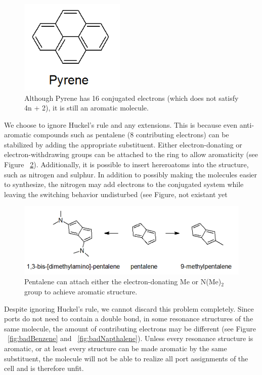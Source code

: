 \documentclass[12pt]{article}
\begin{document}
\begin{figure}[ht!]
\centering
\includegraphics[width=50mm]{pyrene.png}
\caption{Although Pyrene has 16 conjugated electrons (which does not satisfy 4n + 2), it is still an aromatic molecule.}
\label{fig:pyrene}
\end{figure}



We choose to ignore Huckel's rule and any extensions. This is because even anti-aromatic compounds such as pentalene (8 contributing electrons) can be stabilized by adding the appropriate substituent. Either electron-donating or electron-withdrawing groups can be attached to the ring to allow aromaticity (see Figure ~\ref{fig:pentalene}). Additionally, it is possible to insert hereroatoms into the structure, such as nitrogen and sulphur. In addition to possibly making the molecules easier to synthesize, the nitrogen may add electrons to the conjugated system while leaving the switching behavior undisturbed \cite{v06} (see Figure, not existant yet%

\begin{figure}[ht!]
\centering
\includegraphics[width=160mm]{pentalene.png}
\caption{Pentalene can attach either the electron-donating Me \cite{methylPentalene} or N(Me)$_2$ \cite{nitrogenPentalene} group to achieve aromatic structure.}
\label{fig:pentalene}
\end{figure}

Despite ignoring Huckel's rule, we cannot discard this problem completely. Since ports do not need to contain a double bond, in some resonance structures of the same molecule, the amount of contributing electrons may be different (see Figure ~\ref{fig:badBenzene} and ~\ref{fig:badNapthalene}). Unless every resonance structure is aromatic, or at least every structure can be made aromatic by the same substituent, the molecule will not be able to realize all port assignments of the cell and is therefore unfit.  
\end{document}
